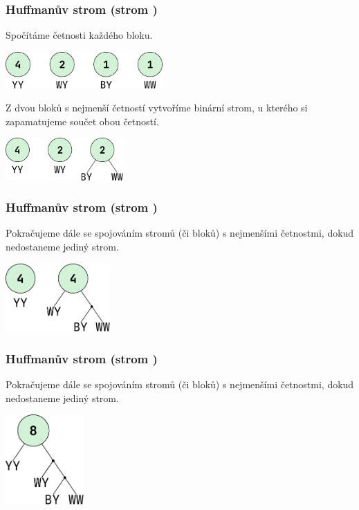 \documentclass[aspectratio=169,11pt,svgnames,handout]{beamer}
\begin{document}
\begin{frame}
 \frametitle{Huffmanův strom (strom )}
 Spočítáme četnosti každého bloku.
 \begin{center}
  \includegraphics[width=6cm]{tree-1.pdf}
  \vspace*{-.5em}
 \end{center}
 \pause
 Z dvou bloků s nejmenší četností vytvoříme binární strom, u kterého si
 zapamatujeme součet obou četností.
 \begin{center}
  \includegraphics[width=4.5cm]{tree-2.pdf}
  \vspace*{-.5em}
 \end{center}
\end{frame}

\begin{frame}
 \frametitle{Huffmanův strom (strom )}
 Pokračujeme dále se spojováním stromů (či bloků) s nejmenšími četnostmi, dokud
 nedostaneme jediný strom.
 \begin{center}
  \includegraphics[width=4cm]{tree-3.pdf}
  \vspace*{-.5em}
 \end{center}
\end{frame}

\begin{frame}
 \frametitle{Huffmanův strom (strom )}
 Pokračujeme dále se spojováním stromů (či bloků) s nejmenšími četnostmi, dokud
 nedostaneme jediný strom.
 \begin{center}
  \includegraphics[width=3cm]{tree-4.pdf}
  \vspace*{-.5em}
 \end{center}
\end{frame}
\end{document}
